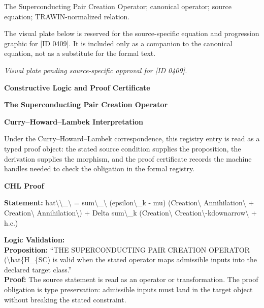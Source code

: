 The Superconducting Pair Creation Operator; canonical operator; source equation; TRAWIN-normalized relation.
\endgroup

\begingroup\footnotesize\sloppy
The visual plate below is reserved for the source-specific equation and progression graphic for [ID 0409]. It is included only as a companion to the canonical equation, not as a substitute for the formal text.
\par\endgroup
\begingroup\footnotesize\itshape
Visual plate pending source-specific approval for [ID 0409].
\par\endgroup

\clearpage
\begingroup\tzpsupportsetup
\noindent\textbf{\fontsize{10.8pt}{12.8pt}\selectfont [ID 0409] Constructive Logic and Proof Certificate}\par
\noindent\textbf{\fontsize{10pt}{12pt}\selectfont The Superconducting Pair Creation Operator}\par
\vspace{0.45em}
\begingroup
\footnotesize
\setlength{\parskip}{0.22em}
\setlength{\parindent}{0pt}
\noindent\textbf{Curry--Howard--Lambek Interpretation}\par
Under the Curry--Howard--Lambek correspondence, this registry entry is read as a typed proof
object: the stated source condition supplies the proposition, the derivation supplies the
morphism, and the proof certificate records the machine handles needed to check the obligation
in the formal registry.

\vspace{0.45em}
\noindent\textbf{CHL Proof}\par
\textbf{Statement:} hat\textbackslash{}\textbackslash{}\_\textbackslash{} = sum\textbackslash{}\_\textbackslash{} (epsilon\textbackslash{}\_k - mu) (Creation\textbackslash{} Annihilation\textbackslash{} + Creation\textbackslash{} Annihilation\textbackslash{}) +
Delta sum\textbackslash{}\_k (Creation\textbackslash{} Creation\textbackslash{}-kdownarrow\textbackslash{} + h.c.)

\textbf{Logic Validation:}\\
\textbf{Proposition:} ``THE SUPERCONDUCTING PAIR CREATION OPERATOR (\textbackslash{}hat\{H\_\{SC) is valid when the stated
operator maps admissible inputs into the declared target class.''\\
\textbf{Proof:} The source statement is read as an operator or transformation. The proof obligation is
type preservation: admissible inputs must land in the target object without breaking the
stated constraint.

